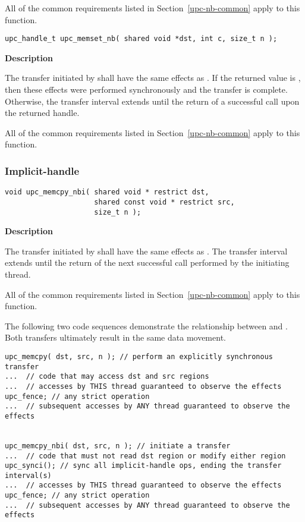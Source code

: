 \np All of the common requirements listed in Section~\ref{upc-nb-common} apply to this function.

\newpage
\def\bfunc{upc\_memset\_nb}
\def\sfunc{{\memset}}
\funcheader

\begin{verbatim}
upc_handle_t upc_memset_nb( shared void *dst, int c, size_t n );
\end{verbatim}

{\bf Description}

\np The transfer initiated by \func\sargs shall have the same effects as \sfunc\sargs.
If the returned value is \complete, then these effects were performed synchronously
and the transfer is complete. Otherwise, the transfer interval extends until
the return of a successful \sync call upon the returned handle.

\np All of the common requirements listed in Section~\ref{upc-nb-common} apply to this function.

\newpage
\subsubsection{Implicit-handle \TIFs}
\def\bfunc{upc\_memcpy\_nbi}
\def\sfunc{\memcpy}
\funcheader

\begin{verbatim}
void upc_memcpy_nbi( shared void * restrict dst,
                     shared const void * restrict src, 
                     size_t n );
\end{verbatim}

{\bf Description}

\np The transfer initiated by \func\args shall have the same effects as \sfunc\args.
The transfer interval extends until the return of the next successful 
\synci call performed by the initiating thread.

\np All of the common requirements listed in Section~\ref{upc-nb-common} apply to this function.

\np The following two code sequences demonstrate the relationship between
\sfunc and \func. Both transfers ultimately result in the same data movement.

\begin{verbatim}
upc_memcpy( dst, src, n ); // perform an explicitly synchronous transfer
...  // code that may access dst and src regions
...  // accesses by THIS thread guaranteed to observe the effects
upc_fence; // any strict operation
...  // subsequent accesses by ANY thread guaranteed to observe the effects


upc_memcpy_nbi( dst, src, n ); // initiate a transfer 
...  // code that must not read dst region or modify either region
upc_synci(); // sync all implicit-handle ops, ending the transfer interval(s)
...  // accesses by THIS thread guaranteed to observe the effects
upc_fence; // any strict operation
...  // subsequent accesses by ANY thread guaranteed to observe the effects
\end{verbatim}
\vfill


